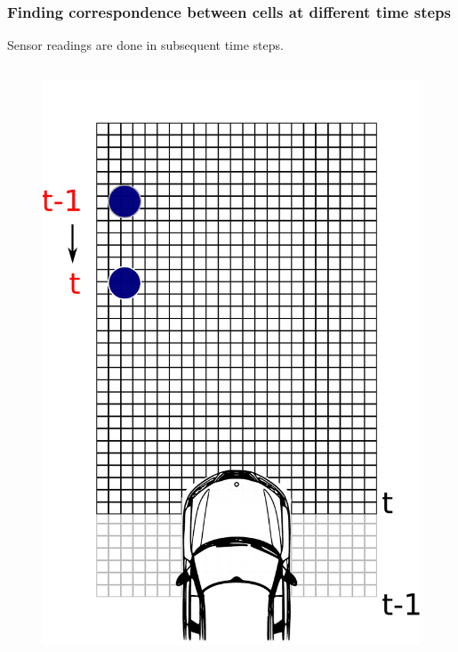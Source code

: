 \documentclass{beamer}
\begin{document}
	\begin{frame}
		\frametitle{Finding correspondence between cells at different time steps}

		Sensor readings are done in subsequent time steps.

		  \begin{columns}[t]
		  \begin{column}{5cm}
			\begin{figure}[h]
			\center
			\includegraphics[scale=0.2]{img/fig:motion:algorithm:nonstatic:02}
		\end{figure}	
		  \end{column}
		  

\end{columns}
\end{frame}
\end{document}
